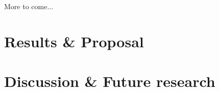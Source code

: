 \documentclass[11pt, titlepage, oneside, a4paper]{report}
\begin{document}
\vspace{10mm}
More to come...

\tableofcontents
\thispagestyle{empty}
\newpage
\setcounter{page}{1}
\setcounter{section}{0}

\newcommand{\Section}[1]{\section{#1}\vspace{-15pt}}
\newcommand{\Subsection}[1]{\vspace{-4pt}\subsection{#1}\vspace{-15pt}}
\newcommand{\Subsubsection}[1]{\vspace{-4pt}\subsubsection{#1}\vspace{-15pt}}















\chapter{Results \& Proposal}
\chapter{Discussion \& Future research}

\twocolumn


\onecolumn


\end{document}

